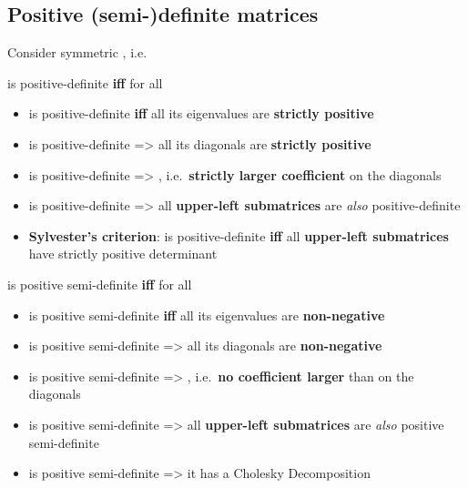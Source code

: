 
\subsection*{Positive (semi-)definite matrices}

Consider symmetric ,
i.e. 

 is positive-definite \textbf{iff}  for all

\begin{itemize}

      \item
             is positive-definite \textbf{iff} all its eigenvalues are
            \textbf{strictly positive}
      \item
             is positive-definite =\textgreater{} all its diagonals are
            \textbf{strictly positive}
      \item
             is positive-definite =\textgreater{}
            , i.e.~\textbf{strictly
                  larger coefficient} on the diagonals
      \item
             is positive-definite =\textgreater{} all
            \textbf{upper-left submatrices} are \emph{also} positive-definite
      \item
            \textbf{Sylvester's criterion}:  is positive-definite
            \textbf{iff} all \textbf{upper-left submatrices} have strictly
            positive determinant
\end{itemize}

\hSep %

 is positive semi-definite \textbf{iff} 
for all 

\begin{itemize}

      \item
             is positive semi-definite \textbf{iff} all its eigenvalues
            are \textbf{non-negative}
      \item
             is positive semi-definite =\textgreater{} all its
            diagonals are \textbf{non-negative}
      \item
             is positive semi-definite =\textgreater{}
            , i.e.~\textbf{no
                  coefficient larger} than on the diagonals
      \item
             is positive semi-definite =\textgreater{} all
            \textbf{upper-left submatrices} are \emph{also} positive
            semi-definite
      \item
             is positive semi-definite =\textgreater{} it has a
            Cholesky Decomposition
\end{itemize}

